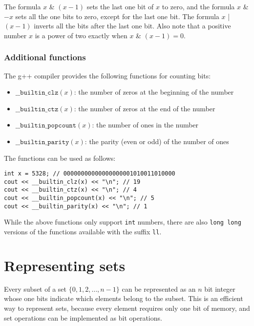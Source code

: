 The formula $x$ \& $(x-1)$ sets the last
one bit of $x$ to zero,
and the formula $x$ \& $-x$ sets all the
one bits to zero, except for the last one bit.
The formula $x$ | $(x-1)$
inverts all the bits after the last one bit.
Also note that a positive number $x$ is
a power of two exactly when $x$ \& $(x-1) = 0$.

\subsubsection*{Additional functions}

The g++ compiler provides the following
functions for counting bits:

\begin{itemize}
\item
$\texttt{\_\_builtin\_clz}(x)$:
the number of zeros at the beginning of the number
\item
$\texttt{\_\_builtin\_ctz}(x)$:
the number of zeros at the end of the number
\item
$\texttt{\_\_builtin\_popcount}(x)$:
the number of ones in the number
\item
$\texttt{\_\_builtin\_parity}(x)$:
the parity (even or odd) of the number of ones
\end{itemize}
\begin{samepage}

The functions can be used as follows:
\begin{lstlisting}
int x = 5328; // 00000000000000000001010011010000
cout << __builtin_clz(x) << "\n"; // 19
cout << __builtin_ctz(x) << "\n"; // 4
cout << __builtin_popcount(x) << "\n"; // 5
cout << __builtin_parity(x) << "\n"; // 1
\end{lstlisting}
\end{samepage}

While the above functions only support \texttt{int} numbers,
there are also \texttt{long long} versions of
the functions available with the suffix \texttt{ll}.

\section{Representing sets}

Every subset of a set
$\{0,1,2,\ldots,n-1\}$
can be represented as an $n$ bit integer
whose one bits indicate which
elements belong to the subset.
This is an efficient way to represent sets,
because every element requires only one bit of memory,
and set operations can be implemented as bit operations.

